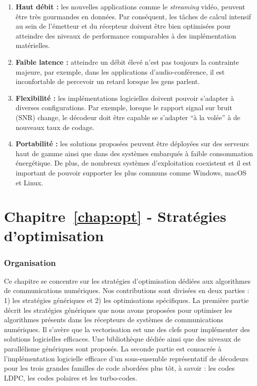 \begin{enumerate}
  \item \textbf{Haut débit :}
    les nouvelles applications comme le \emph{streaming} vidéo, peuvent être
    très gourmandes en données. Par conséquent, les tâches de calcul intensif au
    sein de l'émetteur et du récepteur doivent être bien optimisées pour
    atteindre des niveaux de performance comparables à des implémentation
    matérielles.

  \item \textbf{Faible latence :}
    atteindre un débit élevé n'est pas toujours la contrainte majeure, par
    exemple, dans les applications d'audio-conférence, il est inconfortable de
    percevoir un retard lorsque les gens parlent.

  \item \textbf{Flexibilité :}
    les implémentations logicielles doivent pouvoir s'adapter à diverses
    configurations. Par exemple, lorsque le rapport signal sur bruit (SNR)
    change, le décodeur doit être capable se s'adapter ``à la volée'' à de
    nouveaux taux de codage.

  \item \textbf{Portabilité :}
    les solutions proposées peuvent être déployées sur des serveurs haut de
    gamme ainsi que dans des systèmes embarqués à faible consommation
    énergétique. De plus, de nombreux systèmes d'exploitation coexistent et il
    est important de pouvoir supporter les plus communs comme Windows, macOS et
    Linux.
\end{enumerate}

\section*{Chapitre~\ref{chap:opt} - Stratégies d'optimisation}

\subsubsection*{Organisation}

Ce chapitre se concentre sur les stratégies d'optimisation dédiées aux
algorithmes de communications numériques. Nos contributions sont divisées en
deux parties : 1) les stratégies génériques et 2) les optimisations spécifiques.
La première partie décrit les stratégies génériques que nous avons proposées
pour optimiser les algorithmes présents dans les récepteurs de systèmes de
communications numériques. Il s'avère que la vectorisation est une des clefs
pour implémenter des solutions logicielles efficaces. Une bibliothèque dédiée
ainsi que des niveaux de parallélisme génériques sont proposés. La seconde
partie est consacrée à l'implémentation logicielle efficace d'un sous-ensemble
représentatif de décodeurs pour les trois grandes familles de code abordées plus
tôt, à savoir : les codes LDPC, les codes polaires et les turbo-codes.

